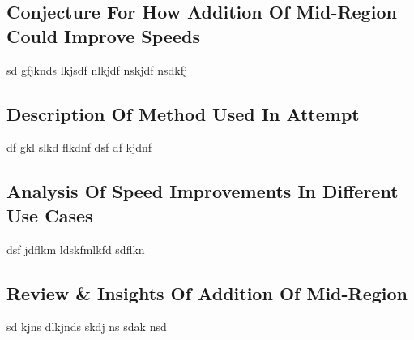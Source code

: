 \subsection{Conjecture For How Addition Of Mid-Region Could Improve Speeds}
sd gfjknds lkjsdf nlkjdf nskjdf nsdkfj 

\subsection{Description Of Method Used In Attempt}
df gkl slkd flkdnf dsf
df kjdnf 

\subsection{Analysis Of Speed Improvements In Different Use Cases}
dsf jdflkm ldskfmlkfd sdflkn

\subsection{Review \& Insights Of Addition Of Mid-Region}
sd kjns dlkjnds 
skdj ns 
sdak nsd 



